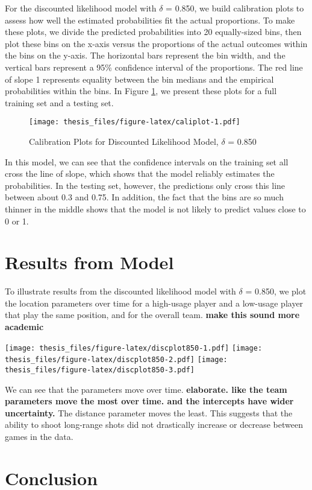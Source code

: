 \documentclass[12pt,twoside]{dukestatscithesis}
\theoremstyle{definition}
\theoremstyle{definition}
\theoremstyle{definition}
\theoremstyle{remark}
\begin{document}
For the discounted likelihood model with \(\delta\) = 0.850, we build
calibration plots to assess how well the estimated probabilities fit the
actual proportions. To make these plots, we divide the predicted
probabilities into 20 equally-sized bins, then plot these bins on the
x-axis versus the proportions of the actual outcomes within the bins on
the y-axis. The horizontal bars represent the bin width, and the
vertical bars represent a 95\% confidence interval of the proportions.
The red line of slope 1 represents equality between the bin medians and
the empirical probabilities within the bins. In Figure
\ref{fig:caliplot}, we present these plots for a full training set and a
testing set.
\begin{figure}[htbp]
\centering
\texttt{[image: thesis\_files/figure-latex/caliplot-1.pdf]}
\caption{\label{fig:caliplot}Calibration Plots for Discounted Likelihood
Model, \(\delta\) = 0.850}
\end{figure}
In this model, we can see that the confidence intervals on the training
set all cross the line of slope, which shows that the model reliably
estimates the probabilities. In the testing set, however, the
predictions only cross this line between about 0.3 and 0.75. In
addition, the fact that the bins are so much thinner in the middle shows
that the model is not likely to predict values close to 0 or 1.

\section{Results from Model}\label{results-from-model}

To illustrate results from the discounted likelihood model with
\(\delta\) = 0.850, we plot the location parameters over time for a
high-usage player and a low-usage player that play the same position,
and for the overall team. \textbf{make this sound more academic}

\texttt{[image: thesis\_files/figure-latex/discplot850-1.pdf]}
\texttt{[image: thesis\_files/figure-latex/discplot850-2.pdf]}
\texttt{[image: thesis\_files/figure-latex/discplot850-3.pdf]}

We can see that the parameters move over time. \textbf{elaborate. like
the team parameters move the most over time. and the intercepts have
wider uncertainty.} The distance parameter moves the least. This
suggests that the ability to shoot long-range shots did not drastically
increase or decrease between games in the data.

\section{Conclusion}\label{conclusion}
\end{document}
